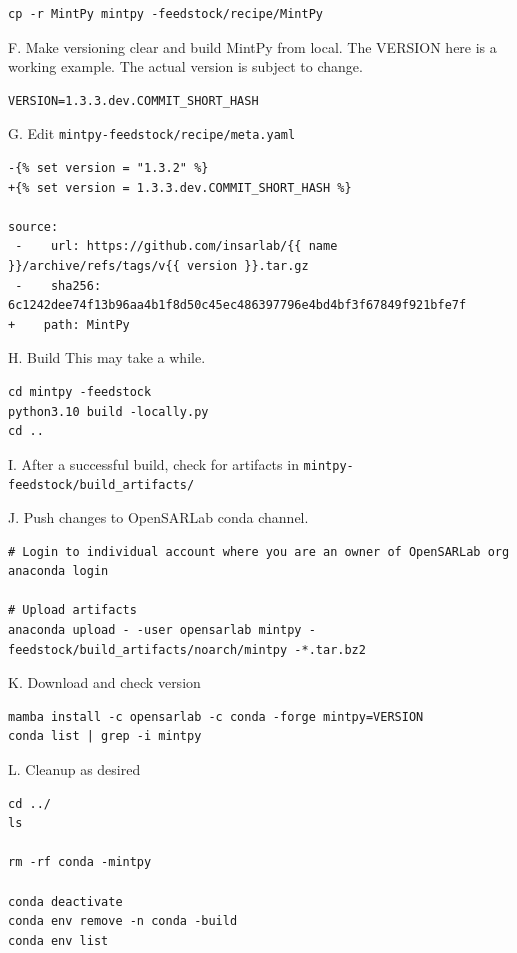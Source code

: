 \begin{verbatim}
cp -r MintPy mintpy -feedstock/recipe/MintPy
\end{verbatim}

F. Make versioning clear and build MintPy from local. The VERSION here is a working example. The actual version is subject to change.

\begin{verbatim}
VERSION=1.3.3.dev.COMMIT_SHORT_HASH
\end{verbatim}

G. Edit \texttt{mintpy-feedstock/recipe/meta.yaml}

\begin{verbatim}
-{% set version = "1.3.2" %}
+{% set version = 1.3.3.dev.COMMIT_SHORT_HASH %}

source:
 -    url: https://github.com/insarlab/{{ name }}/archive/refs/tags/v{{ version }}.tar.gz
 -    sha256: 6c1242dee74f13b96aa4b1f8d50c45ec486397796e4bd4bf3f67849f921bfe7f
+    path: MintPy
\end{verbatim}

H. Build
This may take a while.

\begin{verbatim}
cd mintpy -feedstock
python3.10 build -locally.py
cd ..
\end{verbatim}

I. After a successful build, check for artifacts in \texttt{mintpy-feedstock/build\_artifacts/}

J. Push changes to OpenSARLab conda channel.

\begin{verbatim}
# Login to individual account where you are an owner of OpenSARLab org
anaconda login

# Upload artifacts
anaconda upload - -user opensarlab mintpy -feedstock/build_artifacts/noarch/mintpy -*.tar.bz2
\end{verbatim}

K. Download and check version

\begin{verbatim}
mamba install -c opensarlab -c conda -forge mintpy=VERSION
conda list | grep -i mintpy
\end{verbatim}

L. Cleanup as desired

\begin{verbatim}
cd ../
ls

rm -rf conda -mintpy

conda deactivate
conda env remove -n conda -build
conda env list
\end{verbatim}